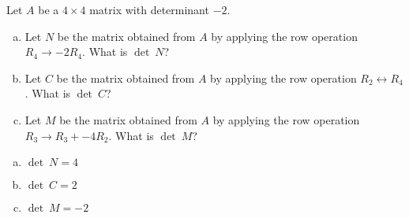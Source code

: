 
\begin{exerciseStatement}


Let \(A\) be a \(4 \times 4\) matrix with determinant \( -2 \).


\begin{enumerate}[(a)]
\item Let \(N\) be the matrix obtained from \(A\) by applying the row operation \( R_4 \to -2R_4 \). What is \(\operatorname{det}\ N\)?
\item Let \(C\) be the matrix obtained from \(A\) by applying the row operation \( R_2 \leftrightarrow R_4 \). What is \(\operatorname{det}\ C\)?
\item Let \(M\) be the matrix obtained from \(A\) by applying the row operation \( R_3 \to R_3 + -4R_2 \). What is \(\operatorname{det}\ M\)?
\end{enumerate}
    
\end{exerciseStatement}
    
\begin{exerciseAnswer} 

\begin{enumerate}[(a)]
\item \(\operatorname{det}\ N= 4 \)
\item \(\operatorname{det}\ C= 2 \)
\item \(\operatorname{det}\ M= -2 \)
\end{enumerate}
    
\end{exerciseAnswer}
    
